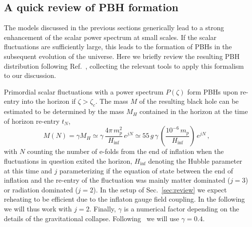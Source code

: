 \subsection{A quick review of PBH formation}

The models discussed in the previous sections generically lead to a strong enhancement of the scalar power spectrum at small scales. If the scalar fluctuations are sufficiently large, this leads to the formation of PBHs in the subsequent evolution of the universe. Here we briefly review the resulting PBH distribution following Ref.~\cite{Carr:2009jm}, collecting the relevant tools to apply this formalism to our discussion.

Primordial scalar fluctuations with a power spectrum $P(\zeta)$ form PBHs upon re-entry into the horizon if  $\zeta > \zeta_c$. The mass $M$ of the resulting black hole can be estimated to be determined by the mass $M_H$ contained in the horizon at the  time of horizon re-entry $t_N$,
\begin{equation}
M(N) = \gamma M_H
 \simeq  \gamma \, \frac{4 \pi \, m_p^2}{H_\text{inf}}\,  e^{j N} \simeq 55 \, g \, \gamma \, \left( \frac{10^{-6} \, m_p}{H_\text{inf}}\right) \, e^{j N} \,,
 \label{eq:MH}
\end{equation}
with $N$ counting the number of e-folds from the end of inflation when the fluctuations in question exited the horizon, $H_\text{inf}$ denoting the Hubble parameter at this time and $j$ parameterizing if the equation of state between the end of inflation and the re-entry of the fluctuation was mainly matter dominated ($j = 3$) or radiation dominated ($j = 2$). In the setup of Sec.~\ref{sec:review} we expect reheating to be efficient due to the inflaton gauge field coupling. In the following we will thus work with $j = 2$. Finally, $\gamma$ is a numerical factor depending on the details of the gravitational collapse. Following~\cite{Green:2004wb, Carr:2016drx} we will use $\gamma = 0.4$. 

